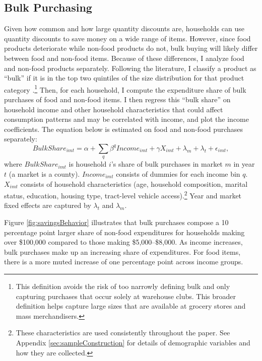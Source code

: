 \documentclass[AER]{AEA_mal}
\begin{document}
\subsection{Bulk Purchasing}
\label{bulkPurchasing}
Given how common and how large quantity discounts are, households can use quantity discounts to save money on a wide range of items. However, since food products deteriorate while non-food products do not, bulk buying will likely differ between food and non-food items. Because of these differences, I analyze food and non-food products separately. Following the literature, I classify a product as ``bulk'' if it is in the top two quintiles of the size distribution for that product category \citep{nevo2009}.\footnote{This definition avoids the risk of too narrowly defining bulk and only capturing purchases that occur solely at warehouse clubs. This broader definition helps capture large sizes that are available at grocery stores and mass merchandisers.} Then, for each household, I compute the expenditure share of bulk purchases of food and non-food items. I then regress this ``bulk share'' on household income and other household characteristics that could affect consumption patterns and may be correlated with income, and plot the income coefficients. The equation below is estimated on food and non-food purchases separately:
\begin{equation}
\label{eq:discountingBehavior}
BulkShare_{imt} = \alpha + \sum_{q} \beta^{q} Income_{imt} + \gamma X_{imt} + \lambda_m + \lambda_t + \epsilon_{imt},
\end{equation}
where $BulkShare_{imt}$ is household $i$'s share of bulk purchases in market $m$ in year $t$ (a market is a county). $Income_{imt}$ consists of dummies for each income bin $q$. $X_{imt}$ consists of household characteristics (age, household composition, marital status, education, housing type, tract-level vehicle access).\footnote{These characteristics are used consistently throughout the paper. See Appendix \ref{sec:sampleConstruction} for details of demographic variables and how they are collected.} Year and market fixed effects are captured by $\lambda_t$ and $\lambda_m$.

Figure \ref{fig:savingsBehavior} illustrates that bulk purchases compose a 10 percentage point larger share of non-food expenditures for households making over \$100,000 compared to those making \$5,000--\$8,000. As income increases, bulk purchases make up an increasing share of expenditures. For food items, there is a more muted increase of one percentage point across income groups.
\end{document}
